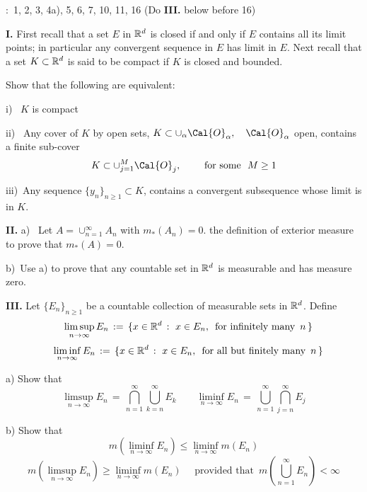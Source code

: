 :\, 1, 2, 3,  4a), 5, 6, 7, 10, 11, 16 (Do {\bf{ III.}} below before 16)

\medskip







\medskip


{\bf I.}  First recall that a set $E$ in $\Bbb R^d$ is closed if and only if $E$ contains all its limit points; in particular any convergent sequence in $E$ has limit in $E$.
Next recall that a set $K \subset \Bbb R^d$ is said to be compact if $K$ is closed and bounded. 

\medskip

Show that the following are equivalent:
\smallskip

i)  \, $K$ is compact
\smallskip

ii) \,  Any cover of $K$ by open sets, $K \subset \cup_{\alpha} \Cal{O}_{\alpha}, \quad \Cal{O}_{\alpha}$ open,  contains a finite sub-cover $$K \subset \cup_{j=1}^M  \Cal{O}_{j}, \qquad \text{ for some } \, \, M \geq 1$$ 

\smallskip

iii)\, Any sequence $\{y_n\}_{n \geq 1} \subset K$, contains a convergent subsequence whose limit is in $K$.

\bigskip

{\bf II.}   a) \, Let $ A = \cup_{n=1}^{\infty} A_n$ with $ m_{\ast}(A_n) = 0$.  the definition of exterior measure to prove that $m_{\ast}(A) =0$.

\smallskip

b)\, Use a) to prove that any countable set in $\Bbb R^d$ is measurable and has measure zero. 

{\bf III.}  Let $\{E_n\}_{n\geq 1}$ be a countable collection of measurable sets in $\Bbb R^d$. Define
$$  \quad  \limsup_{n \to \infty} E_n \,:=\, \{ x \in \Bbb R^d \, :\, \, x \in E_n, \, \text{ for infinitely many } \, n \, \} $$
$$  \quad  \liminf_{n \to \infty} E_n \,:=\, \{ x \in \Bbb R^d \, :\, \, x \in E_n, \, \text{ for all but finitely many } \, n \, \} $$
 
\smallskip 

a) Show that  $$\limsup_{n\to \infty} E_n \,=\, \bigcap_{n=1}^\infty \bigcup_{k=n}^{\infty} E_k \qquad \liminf_{n\to \infty} E_n \,=\, \bigcup_{n=1}^\infty \bigcap_{j=n}^{\infty} E_j $$

b) Show that $$ m( \liminf_{n\to \infty} E_n ) \leq \liminf_{n\to \infty} m(E_n ) $$ 
$$  m( \limsup_{n\to \infty} E_n ) \geq   \liminf_{n\to \infty} m(E_n )  \quad \text{ provided that } \, m(\bigcup_{n=1}^\infty E_n ) < \infty $$

\enddocument



                                               













